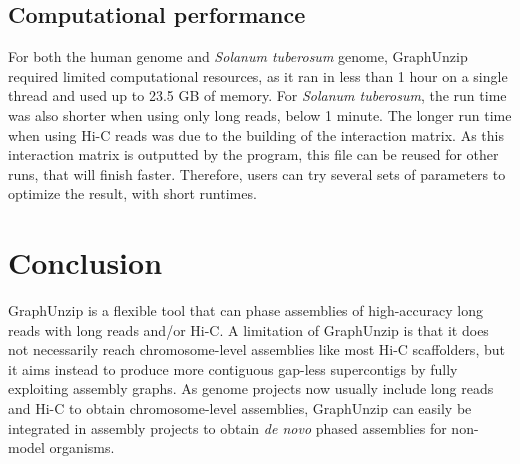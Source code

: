 \subsection{Computational performance}

For both the human genome and \textit{Solanum tuberosum} genome, GraphUnzip required limited computational resources, as it ran in less than 1 hour on a single thread and used up to 23.5 GB of memory. For \textit{Solanum tuberosum}, the run time was also shorter when using only long reads, below 1 minute. The longer run time when using Hi-C reads was due to the building of the interaction matrix. As this interaction matrix is outputted by the program, this file can be reused for other runs, that will finish faster. Therefore, users can try several sets of parameters to optimize the result, with short runtimes. \\

\section{Conclusion}

GraphUnzip is a flexible tool that can phase assemblies of high-accuracy long reads with long reads and/or Hi-C. A limitation of GraphUnzip is that it does not necessarily reach chromosome-level assemblies like most Hi-C scaffolders, but it aims instead to produce more contiguous gap-less supercontigs by fully exploiting assembly graphs. As genome projects now usually include long reads and Hi-C to obtain chromosome-level assemblies, GraphUnzip can easily be integrated in assembly projects to obtain \textit{de novo} phased assemblies for non-model organisms. \\
